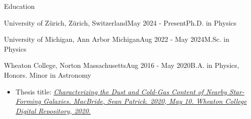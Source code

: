 \documentclass{resume} %
\begin{document}
\begin{rSection}{Education}
    \begin{rSubsection}
        {University of Zürich, Zürich, Switzerland}{May 2024 - Present}{Ph.D. in Physics}{}
        
    \end{rSubsection}
    
    \begin{rSubsection}
        {University of Michigan, Ann Arbor Michigan}{Aug 2022 - May 2024}{M.Sc. in Physics}{}
        
    \end{rSubsection}

\begin{rSubsection}{Wheaton College, Norton Massachusetts}{Aug 2016 - May 2020}{B.A. in Physics, Honors. Minor in Astronomy}{}
   \begin{itemize}
    \item Thesis title: \textit{\href{https://digitalrepository.wheatoncollege.edu/handle/11040/31192}{Characterizing the Dust and Cold-Gas Content of Nearby Star-Forming Galaxies. MacBride, Sean Patrick. 2020, May 10.  Wheaton College Digital Repository, 2020.}}
   \end{itemize}
\end{rSubsection}


\end{rSection}
\end{document}
